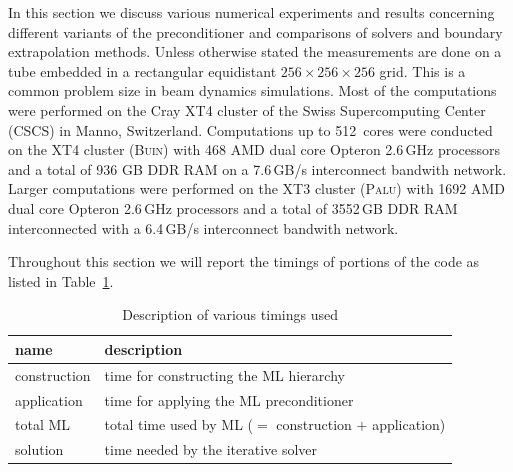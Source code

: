 \documentclass[a4paper,10pt,3p,preprint,pdftex]{elsarticle}
\begin{document}
In this section we discuss various numerical experiments and results
concerning different variants of the preconditioner and comparisons of
solvers and boundary extrapolation methods.  Unless otherwise stated the
measurements are done on a tube embedded in a rectangular equidistant
$256\times256\times256$ grid.  This is a common problem size in beam
dynamics simulations.  Most of the computations were performed on the
Cray XT4 cluster of the Swiss Supercomputing Center (CSCS) in Manno,
Switzerland. Computations up to 512~cores were conducted on the XT4
cluster (\textsc{Buin}) with 468 AMD dual core Opteron 2.6\,GHz
processors and a total of 936 GB DDR RAM on a 7.6\,GB/s interconnect
bandwith network.  Larger computations were performed on the XT3 cluster
(\textsc{Palu}) with 1692 AMD dual core Opteron 2.6\,GHz processors and a
total of 3552\,GB DDR RAM interconnected with a 6.4\,GB/s interconnect
bandwith network.

Throughout this section we will report the timings of portions of the
code as listed in Table~\ref{tbl:timings_description}.
\begin{table}[ht]
  \begin{center}
    \begin{tabular}{ll}
      \hline
      name & description \\
      \hline
      construction & time for constructing the ML hierarchy \\
      application  & time for applying the ML preconditioner \\
      total ML     & total time used by ML ($=$ construction $+$ application) \\
      solution     & time needed by the iterative solver \\
      \hline
    \end{tabular}
    \caption{Description of various timings used}
    \label{tbl:timings_description}
  \end{center}
\end{table}
\end{document}
